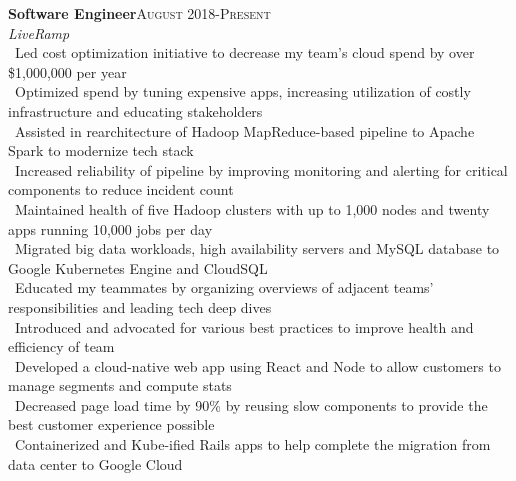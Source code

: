 \documentclass[a4paper,10pt]{article}
\renewcommand{\subsection}[2]{{\noindent \textbf{#1}\hfill \textsc{#2}\\}}
\begin{document}
\subsection{Software Engineer}{August 2018-Present}
\textit{LiveRamp}\\
\textbullet\ Led cost optimization initiative to decrease my team's cloud spend by over \$1,000,000 per year\\
\textbullet\ Optimized spend by tuning expensive apps, increasing utilization of costly infrastructure and educating stakeholders\\
\textbullet\ Assisted in rearchitecture of Hadoop MapReduce-based pipeline to Apache Spark to modernize tech stack\\
\textbullet\ Increased reliability of pipeline by improving monitoring and alerting for critical components to reduce incident count\\
\textbullet\ Maintained health of five Hadoop clusters with up to 1,000 nodes and twenty apps running 10,000 jobs per day\\
\textbullet\ Migrated big data workloads, high availability servers and MySQL database to Google Kubernetes Engine and CloudSQL\\
\textbullet\ Educated my teammates by organizing overviews of adjacent teams' responsibilities and leading tech deep dives\\
\textbullet\ Introduced and advocated for various best practices to improve health and efficiency of team\\
\textbullet\ Developed a cloud-native web app using React and Node to allow customers to manage segments and compute stats\\
\textbullet\ Decreased page load time by 90\% by reusing slow components to provide the best customer experience possible\\
\textbullet\ Containerized and Kube-ified Rails apps to help complete the migration from data center to Google Cloud\\
\end{document}
